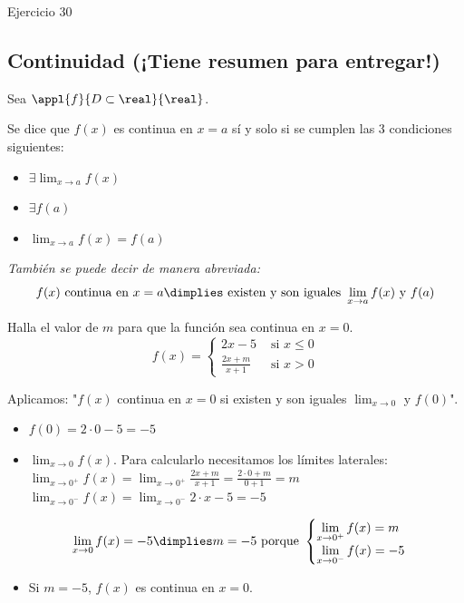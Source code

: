 \begin{problem}
Ejercicio 30
\solution
\end{problem}

\subsection{Continuidad (¡Tiene resumen para entregar!)}

\begin{defn}
Sea $\appl{f}{D\subset\real}{\real}$.

Se dice que $f(x)$ es continua en $x=a$ sí y solo si se cumplen las 3 condiciones siguientes:
\begin{itemize}
	\item $\exists \displaystyle\lim_{x\to a} f(x)$
	\item $\exists f(a)$
	\item $\displaystyle\lim_{x\to a}f(x) = f(a)$
\end{itemize}

\textit{También se puede decir de manera abreviada: \[f(x) \text{ continua en } x=a\dimplies \text{ existen y son iguales } \lim_{x\to a}f(x) \text{ y } f(a)\]}
\end{defn}

\begin{problem}
Halla el valor de $m$ para que la función sea continua en $x=0$.
\[f(x) = 
	\begin{cases}
		2x-5 & \text{ si }x\leq 0\\ 
		\frac{2x+m}{x+1} & \text{ si } x>0
	\end{cases}\]
\solution

Aplicamos: "$f(x)$ continua en $x=0$ si existen y son iguales $\displaystyle\lim_{x\to 0}$ y $f(0)$".

\begin{itemize}
	\item $f(0) =  2·0-5 = -5$
	\item $\displaystyle\lim_{x\to0} f(x)$. Para calcularlo necesitamos los límites laterales:
	\subitem $\displaystyle\lim_{x\to0^+} f(x) = \lim_{x\to0^+} \frac{2x+m}{x+1} = \frac{2·0+m}{0+1} = m$
	\subitem $\displaystyle\lim_{x\to0^-} f(x) = \lim_{x\to0^-} 2·x-5 = -5$

	\[\lim_{x\to 0} f(x) = -5 \dimplies m=-5 \text{ porque } \begin{cases}\displaystyle\lim_{x\to0^+}f(x) = m\\ \displaystyle\lim_{x\to0^-}f(x) = -5\end{cases}\]
	\item Si $m=-5$, $f(x)$ es continua en $x=0$.
\end{itemize}

\end{problem}

